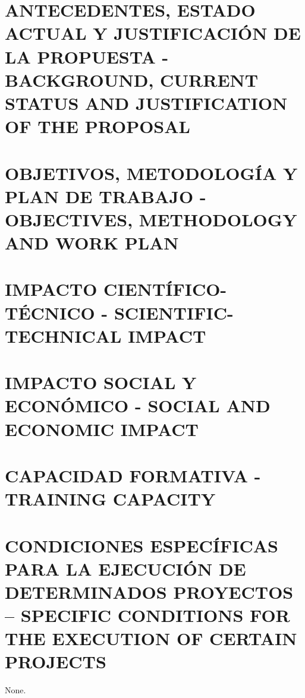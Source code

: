 \documentclass[a4paper,11pt,oneside, english]{article}
\begin{document}
\section{\small ANTECEDENTES, ESTADO ACTUAL Y JUSTIFICACIÓN DE LA PROPUESTA - BACKGROUND, CURRENT STATUS AND JUSTIFICATION OF THE PROPOSAL}
\label{sec.just}

\label{sec.proposal}







\section{\small  OBJETIVOS, METODOLOGÍA Y PLAN DE TRABAJO - OBJECTIVES, METHODOLOGY AND WORK PLAN}











\section{\small  IMPACTO CIENTÍFICO-TÉCNICO - SCIENTIFIC-TECHNICAL IMPACT}
\label{sec.impact}

\section{\small  IMPACTO SOCIAL Y ECONÓMICO - SOCIAL AND ECONOMIC IMPACT}
\label{sec.social}


\section{\small CAPACIDAD FORMATIVA - TRAINING CAPACITY}
\label{sec.training}

\section{\small  CONDICIONES ESPECÍFICAS PARA LA EJECUCIÓN DE DETERMINADOS PROYECTOS – SPECIFIC CONDITIONS FOR THE EXECUTION OF CERTAIN PROJECTS}
\label{sec.specs}
None.


%

\end{document}
